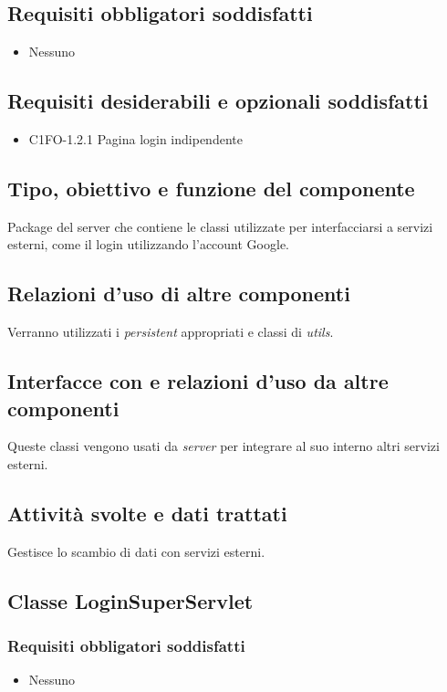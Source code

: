 \subsection*{Requisiti obbligatori soddisfatti}
\begin{itemize}
	\item Nessuno
\end{itemize}
\subsection*{Requisiti desiderabili e opzionali soddisfatti}
\begin{itemize}
    \item C1FO-1.2.1 Pagina login indipendente
\end{itemize}
\subsection*{Tipo, obiettivo e funzione del componente}
Package del server che contiene le classi utilizzate per interfacciarsi a
servizi esterni, come il login utilizzando l'account Google.
\subsection*{Relazioni d'uso di altre componenti}
Verranno utilizzati i \emph{persistent} appropriati e classi di \emph{utils}.
\subsection*{Interfacce con e relazioni d'uso da altre componenti}
Queste classi vengono usati da \emph{server} per integrare al suo interno
altri servizi esterni.
\subsection*{Attivit\`a svolte e dati trattati}
Gestisce lo scambio di dati con servizi esterni.


\newpage
\subsection{Classe LoginSuperServlet}
\subsubsection*{Requisiti obbligatori soddisfatti}
\begin{itemize}
    \item Nessuno
\end{itemize}
